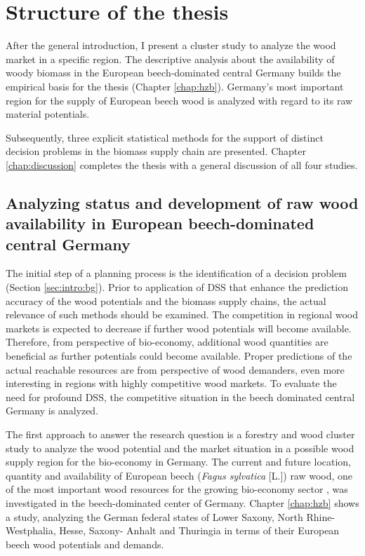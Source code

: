 \section{Structure of the thesis}
\label{sec:intro:struct}
After the general introduction, I present a cluster study to analyze the wood market in a specific region. The descriptive analysis about the availability of woody biomass in the European beech-dominated central Germany builds the empirical basis for the thesis (Chapter \ref{chap:hzb}). Germany's most important region for the supply of European beech wood is analyzed with regard to its raw material potentials.

Subsequently, three explicit statistical methods for the support of distinct decision problems in the biomass supply chain are presented. Chapter \ref{chap:discussion} completes the thesis with a general discussion of all four studies.

\subsection{Analyzing status and development of raw wood availability in European beech-dominated central Germany}
\label{subsec:intro:struct:hzb}
The initial step of a planning process is the identification of a decision problem (Section \ref{sec:intro:bg}). Prior to application of DSS that enhance the prediction accuracy of the wood potentials and the biomass supply chains, the actual relevance of such methods should be examined. The competition in regional wood markets is expected to decrease if further wood potentials will become available. Therefore, from perspective of bio-economy, additional wood quantities are beneficial as further potentials could become available. Proper predictions of the actual reachable resources are from perspective of wood demanders, even more interesting in regions with highly competitive wood markets. To evaluate the need for profound DSS, the competitive situation in the beech dominated central Germany is analyzed.

The first approach to answer the research question is a forestry and wood cluster study to analyze the wood potential and the market situation in a possible wood supply region for the bio-economy in Germany. The current and future location, quantity and availability of European beech (\textit{Fagus sylvatica} [L.]) raw wood, one of the most important wood resources for the growing bio-economy sector \citep[p. 16]{auer_2016}, was investigated in the beech-dominated center of Germany. Chapter \ref{chap:hzb} shows a study, analyzing the German federal states of Lower Saxony, North Rhine-Westphalia, Hesse, Saxony- Anhalt and Thuringia in terms of their European beech wood potentials and demands.

